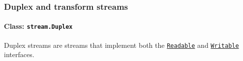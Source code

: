 \begin{Shaded}
\begin{Highlighting}[]
 \OperatorTok{;}
\OperatorTok{,} \OperatorTok{;}
 \OperatorTok{;}

\OperatorTok{=} \OperatorTok{;}
\OperatorTok{=}  \OperatorTok{;}

\OperatorTok{=} 
  \KeywordTok{=\textgreater{}} \NormalTok{(}\OperatorTok{,}\OperatorTok{,}\NormalTok{ \{ }\OperatorTok{:} \NormalTok{ \})}
  \OperatorTok{,}\KeywordTok{=\textgreater{}}\OperatorTok{+}\OperatorTok{,} \NormalTok{)}\OperatorTok{;}

\OperatorTok{;}
\end{Highlighting}
\end{Shaded}

\subsubsection{Duplex and transform
streams}\label{duplex-and-transform-streams}

\paragraph{\texorpdfstring{Class:
\texttt{stream.Duplex}}{Class: stream.Duplex}}\label{class-stream.duplex}

Duplex streams are streams that implement both the
\hyperref[class-streamreadable]{\texttt{Readable}} and
\hyperref[class-streamwritable]{\texttt{Writable}} interfaces.

